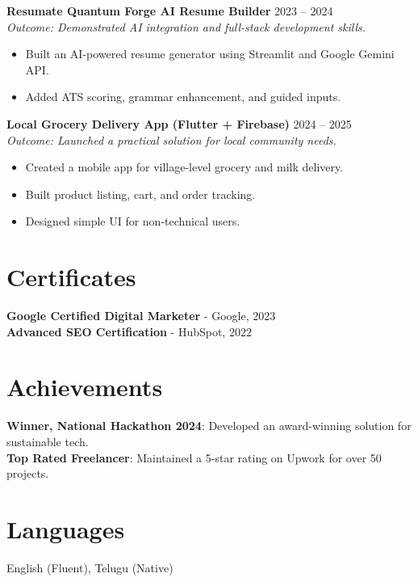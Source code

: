 \documentclass[a4paper,11pt]{article}
\begin{document}
\vspace{0.2cm}
\textbf{Resumate Quantum Forge AI Resume Builder} \hfill 2023 -- 2024\\
\textit{Outcome: Demonstrated AI integration and full-stack development skills.}
\begin{itemize}[leftmargin=*, topsep=0.2cm, itemsep=0pt, parsep=0pt]
    \item Built an AI-powered resume generator using Streamlit and Google Gemini API.
    \item Added ATS scoring, grammar enhancement, and guided inputs.
\end{itemize}

\vspace{0.2cm}
\textbf{Local Grocery Delivery App (Flutter + Firebase)} \hfill 2024 -- 2025\\
\textit{Outcome: Launched a practical solution for local community needs.}
\begin{itemize}[leftmargin=*, topsep=0.2cm, itemsep=0pt, parsep=0pt]
    \item Created a mobile app for village-level grocery and milk delivery.
    \item Built product listing, cart, and order tracking.
    \item Designed simple UI for non-technical users.
\end{itemize}

\section*{Certificates}
\textbf{Google Certified Digital Marketer} - Google, 2023 \\
\textbf{Advanced SEO Certification} - HubSpot, 2022

\section*{Achievements}
\textbf{Winner, National Hackathon 2024}: Developed an award-winning solution for sustainable tech. \\
\textbf{Top Rated Freelancer}: Maintained a 5-star rating on Upwork for over 50 projects.

\section*{Languages}
English (Fluent), Telugu (Native)
\end{document}
